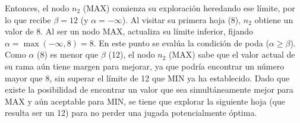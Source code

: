 \documentclass[11pt, a4paper]{article}
\newenvironment{problem}[1][Cuestión]{
	\vspace{0.5cm}
	\noindent{\Large\bfseries #1} \par\vspace{0.5cm}
}{
	\vspace{0.5cm}
}
\begin{document}
\begin{problem}[Cuestión 6 (20\%)]
\begin{itemize}[label=a)]
{					Entonces, el nodo $n_2$ (MAX) comienza su exploración heredando ese límite, por lo que recibe $\beta = 12$ (y $\alpha = -\infty$). Al visitar su primera hoja (8), $n_2$ obtiene un valor de 8. Al ser un nodo MAX, actualiza su límite inferior, fijando $\alpha = \max(-\infty, 8) = 8$. En este punto se evalúa la condición de poda ($\alpha \ge \beta$). Como $\alpha$ (8) es menor que $\beta$ (12), el nodo $n_2$ (MAX) sabe que el valor actual de su rama aún tiene margen para mejorar, ya que podría encontrar un número mayor que 8, sin superar el límite de 12 que MIN ya ha establecido. Dado que existe la posibilidad de encontrar un valor que sea simultáneamente mejor para MAX y aún aceptable para MIN, se tiene que explorar la siguiente hoja (que resulta ser un 12) para no perder una jugada potencialmente óptima.
				}
		\end{itemize} 
	\end{problem}
\end{document}
